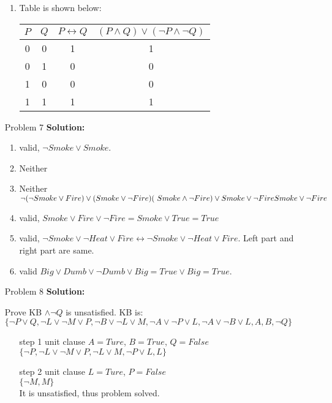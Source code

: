 \normalfont\documentclass[letterpaper,11pt]{article}
\begin{document}
\begin{enumerate}
\begin{enumerate}
		\item Table is shown below:\par
		\begin{tabular}{c|c|c|c}
			\hline
			$P$ & $Q$ & $P \leftrightarrow Q$ & $ (P \land Q)\lor(\neg P \land \neg Q)$ \\
			\hline
			0 & 0 & 1 & 1 \\
			0 & 1 & 0 & 0 \\
			1 & 0 & 0 & 0 \\
			1 & 1 & 1 & 1 \\
		\end{tabular}
	\end{enumerate}
\item[Problem 7]\textbf{Solution:}\par
	\begin{enumerate}
		\item valid, $\neg Smoke \lor Smoke$.
		\item Neither
		\item Neither
			$\neg(\neg Smoke \lor Fire)\lor(Smoke\lor \neg Fire) \\ (\ Smoke \land \neg Fire)\lor Smoke\lor \neg Fire\\Smoke\lor \neg Fire$\\
		 
		\item valid, $Smoke \lor Fire \lor \neg Fire = Smoke \lor True = True$
		\item valid, $\neg Smoke \lor \neg Heat \lor Fire \leftrightarrow \neg Smoke \lor \neg Heat \lor Fire$. Left part and right part are same.
		\item valid $Big \lor Dumb \lor \neg Dumb \lor Big = True \lor Big = True$.
	\end{enumerate}
\item[Problem 8]\textbf{Solution:}\par
	Prove KB $\land \neg Q$ is unsatisfied. KB is: \\
	$\{\neg P \lor Q, \neg L \lor \neg M \lor P, \neg B \lor \neg L \lor M, \neg A\lor \neg P \lor L,\neg A \lor \neg B \lor L, A, B, \neg Q\}$\\
	\begin{enumerate}
		\item[step 1]
			unit clause $A = Ture$, $B = True$, $Q = False$\\
			$\{\neg P,\neg L \lor \neg M \lor P, \neg L \lor M, \neg P \lor L, L\}$\\
		\item[step 2]
			unit clause $L = Ture$, $P = False$\\
			$\{\neg M, M\}$\\
		It is unsatisfied, thus problem solved.
	\end{enumerate}
\end{enumerate}
\end{document}

